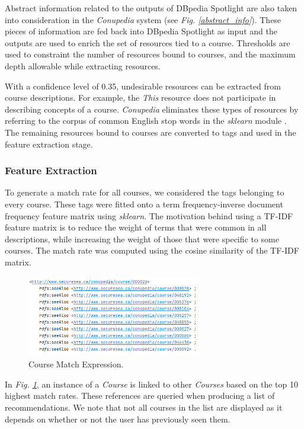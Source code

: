 \documentclass[conference]{IEEEtran}
\begin{document}
            Abstract information related to the outputs of DBpedia Spotlight are also taken into consideration in the \textit{Conupedia} system (see \textit{Fig. \ref{abstract_info}}).
            These pieces of information are fed back into DBpedia Spotlight as input and the outputs are used to enrich the set of resources tied to a course.
            Thresholds are used to constraint the number of resources bound to courses, and the maximum depth allowable while extracting resources.
            
            With a confidence level of 0.35, undesirable resources can be extracted from course descriptions. 
            For example, the \textit{This} resource does not participate in describing concepts of a course.
            \textit{Conupedia} eliminates these types of resources by referring to the corpus of common English stop words in the \textit{sklearn} module \cite{b6}.
            The remaining resources bound to courses are converted to tags and used in the feature extraction stage.\\

        \subsubsection{Feature Extraction}
        

            To generate a match rate for all courses, we considered the tags belonging to every course.
            These tags were fitted onto a term frequency-inverse document frequency feature matrix using \textit{sklearn}.
            The motivation behind using a TF-IDF feature matrix is to reduce the weight of terms that were common in all descriptions, while increasing the weight of those that were specific to some courses.
            The match rate was computed using the cosine similarity of the TF-IDF matrix.
            \begin{figure}[H]
            \centering
            \includegraphics[width=3.0in]{img/top10.png}
            \caption{Course Match Expression.}
            \label{top10}
            \end{figure}
            In \textit{Fig. \ref{top10}}, an instance of a \textit{Course} is linked to other \textit{Courses} based on the top 10 highest match rates. These references are queried when producing a list of recommendations. We note that not all courses in the list are displayed as it depends on whether or not the user has previously seen them. \\
            
\end{document}
